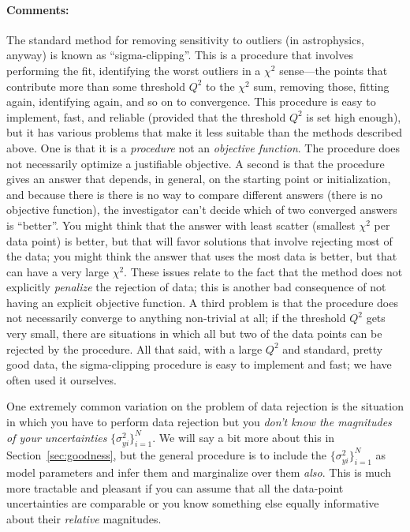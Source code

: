 \documentclass[12pt,twoside]{article}
\newcommand{\sectionname}{Section}
\newcommand{\commentsname}{Comments}
\newcounter{problem}
\newenvironment{comments}{\paragraph{\commentsname:}}{}
\newcommand{\setofall}[3]{\{{#1}\}_{{#2}}^{{#3}}}
\newcommand{\allsigmay}{\setofall{\sigma_{yi}^2}{i=1}{N}}
\begin{document}
\begin{comments}
The standard method for removing sensitivity to outliers (in
astrophysics, anyway) is known as ``sigma-clipping''.  This is a
procedure that involves performing the fit, identifying the worst
outliers in a $\chi^2$ sense---the points that contribute more than
some threshold $Q^2$ to the $\chi^2$ sum, removing those, fitting
again, identifying again, and so on to convergence.  This procedure is
easy to implement, fast, and reliable (provided that the threshold
$Q^2$ is set high enough), but it has various problems that make it
less suitable than the methods described above.  One is that it is a
\emph{procedure} not an \emph{objective function}.  The procedure does
not necessarily optimize a justifiable objective.  A second is that
the procedure gives an answer that depends, in general, on the
starting point or initialization, and because there is there is no way
to compare different answers (there is no objective function), the
investigator can't decide which of two converged answers is
``better''.  You might think that the answer with least scatter
(smallest $\chi^2$ per data point) is better, but that will favor
solutions that involve rejecting most of the data; you might think the
answer that uses the most data is better, but that can have a very
large $\chi^2$.  These issues relate to the fact that the method does
not explicitly \emph{penalize} the rejection of data; this is another
bad consequence of not having an explicit objective function.  A third
problem is that the procedure does not necessarily converge to
anything non-trivial at all; if the threshold $Q^2$ gets very small,
there are situations in which all but two of the data points can be
rejected by the procedure.  All that said, with a large $Q^2$ and
standard, pretty good data, the sigma-clipping procedure is easy to
implement and fast; we have often used it ourselves.

One extremely common variation on the problem of data rejection is the
situation in which you have to perform data rejection but you
\emph{don't know the magnitudes of your uncertainties} $\allsigmay$.
We will say a bit more about this in \sectionname~\ref{sec:goodness},
but the general procedure is to include the $\allsigmay$ as model
parameters and infer them and marginalize over them \emph{also}.  This
is much more tractable and pleasant if you can assume that all the
data-point uncertainties are comparable or you know something else
equally informative about their \emph{relative} magnitudes.
\end{comments}
\end{document}
